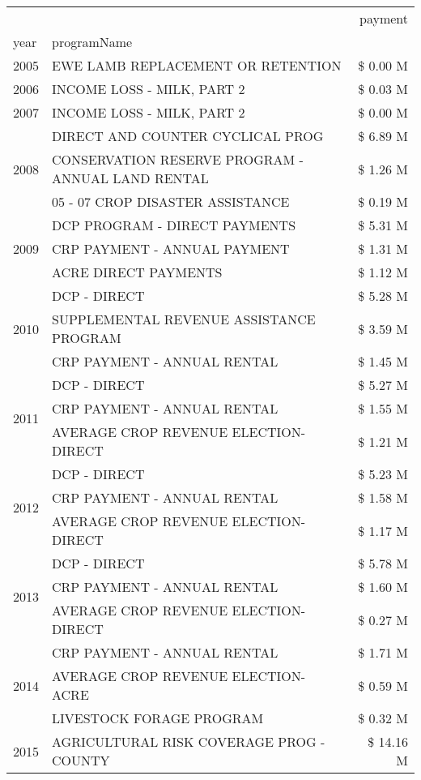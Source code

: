 \begin{tabular}{llr}
\toprule
 &  & payment \\
year & programName &  \\
\midrule
2005 & EWE LAMB REPLACEMENT OR RETENTION & \$ 0.00 M \\
\cline{1-3}
2006 & INCOME LOSS - MILK, PART 2 & \$ 0.03 M \\
\cline{1-3}
2007 & INCOME LOSS - MILK, PART 2 & \$ 0.00 M \\
\cline{1-3}
\multirow[t]{3}{*}{2008} & DIRECT AND COUNTER CYCLICAL PROG & \$ 6.89 M \\
 & CONSERVATION RESERVE PROGRAM - ANNUAL LAND RENTAL & \$ 1.26 M \\
 & 05 - 07 CROP DISASTER ASSISTANCE & \$ 0.19 M \\
\cline{1-3}
\multirow[t]{3}{*}{2009} & DCP PROGRAM - DIRECT PAYMENTS & \$ 5.31 M \\
 & CRP PAYMENT - ANNUAL PAYMENT & \$ 1.31 M \\
 & ACRE DIRECT PAYMENTS & \$ 1.12 M \\
\cline{1-3}
\multirow[t]{3}{*}{2010} & DCP - DIRECT & \$ 5.28 M \\
 & SUPPLEMENTAL REVENUE ASSISTANCE PROGRAM & \$ 3.59 M \\
 & CRP PAYMENT - ANNUAL RENTAL & \$ 1.45 M \\
\cline{1-3}
\multirow[t]{3}{*}{2011} & DCP - DIRECT & \$ 5.27 M \\
 & CRP PAYMENT - ANNUAL RENTAL & \$ 1.55 M \\
 & AVERAGE CROP REVENUE ELECTION-DIRECT & \$ 1.21 M \\
\cline{1-3}
\multirow[t]{3}{*}{2012} & DCP - DIRECT & \$ 5.23 M \\
 & CRP PAYMENT - ANNUAL RENTAL & \$ 1.58 M \\
 & AVERAGE CROP REVENUE ELECTION-DIRECT & \$ 1.17 M \\
\cline{1-3}
\multirow[t]{3}{*}{2013} & DCP - DIRECT & \$ 5.78 M \\
 & CRP PAYMENT - ANNUAL RENTAL & \$ 1.60 M \\
 & AVERAGE CROP REVENUE ELECTION-DIRECT & \$ 0.27 M \\
\cline{1-3}
\multirow[t]{3}{*}{2014} & CRP PAYMENT - ANNUAL RENTAL & \$ 1.71 M \\
 & AVERAGE CROP REVENUE ELECTION-ACRE & \$ 0.59 M \\
 & LIVESTOCK FORAGE PROGRAM & \$ 0.32 M \\
\cline{1-3}
\multirow[t]{3}{*}{2015} & AGRICULTURAL RISK COVERAGE PROG - COUNTY & \$ 14.16 M \\

\end{tabular}
